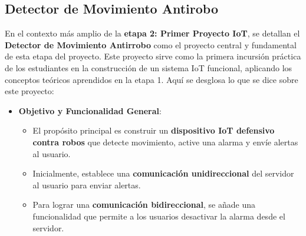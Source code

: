 \documentclass{report}
\begin{document}
\subsection{Detector de Movimiento Antirobo}
En el contexto más amplio de la \textbf{etapa 2: Primer Proyecto IoT}, se  detallan el \textbf{Detector de Movimiento Antirrobo} como el proyecto 
central y fundamental de esta etapa del proyecto. Este proyecto sirve como la primera incursión práctica de los estudiantes en la construcción de un sistema 
IoT funcional, aplicando los conceptos teóricos aprendidos en la etapa 1. Aquí se desglosa lo que se  dice sobre este proyecto:

\begin{itemize}
    \item \textbf{Objetivo y Funcionalidad General}:
    \begin{itemize}
        \item El propósito principal es construir un \textbf{dispositivo IoT defensivo contra robos} que detecte movimiento, active una alarma y envíe alertas 
        al usuario.
        \item Inicialmente, establece una \textbf{comunicación unidireccional} del servidor al usuario para enviar alertas.
        \item Para lograr una \textbf{comunicación bidireccional}, se añade una funcionalidad que permite a los usuarios desactivar la alarma desde el 
        servidor.
    \end{itemize}
    

\end{itemize}
\end{document}

